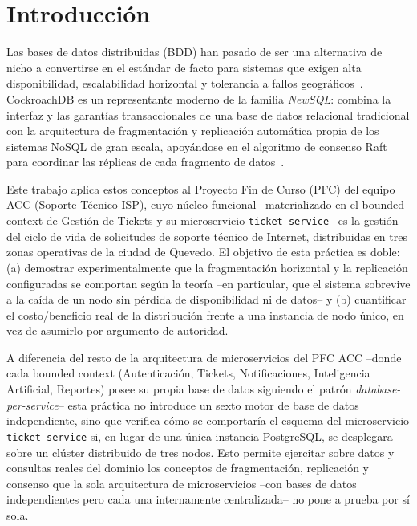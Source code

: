 \documentclass[11pt,a4paper]{article}
\begin{document}
\section{Introducci\'on}
\label{sec:introduccion}

Las bases de datos distribuidas (BDD) han pasado de ser una alternativa de
nicho a convertirse en el est\'andar de facto para sistemas que exigen alta
disponibilidad, escalabilidad horizontal y tolerancia a fallos
geogr\'aficos~\cite{kleppmann2017,ozsu2020}. CockroachDB es un representante
moderno de la familia \emph{NewSQL}: combina la interfaz y las garant\'ias
transaccionales de una base de datos relacional tradicional con la
arquitectura de fragmentaci\'on y replicaci\'on autom\'atica propia de los
sistemas NoSQL de gran escala, apoy\'andose en el algoritmo de consenso
Raft~\cite{ongaro2014} para coordinar las r\'eplicas de cada fragmento de
datos~\cite{taft2020}.

Este trabajo aplica estos conceptos al Proyecto Fin de Curso (PFC) del equipo
ACC (Soporte T\'ecnico ISP), cuyo n\'ucleo funcional --materializado en el
bounded context de Gesti\'on de Tickets y su microservicio
\texttt{ticket-service}-- es la gesti\'on del ciclo de vida de solicitudes de
soporte t\'ecnico de Internet, distribuidas en tres zonas operativas de la
ciudad de Quevedo. El objetivo de esta pr\'actica es doble: (a) demostrar
experimentalmente que la fragmentaci\'on horizontal y la replicaci\'on
configuradas se comportan seg\'un la teor\'ia --en particular, que el sistema
sobrevive a la ca\'ida de un nodo sin p\'erdida de disponibilidad ni de
datos-- y (b) cuantificar el costo/beneficio real de la distribuci\'on frente
a una instancia de nodo \'unico, en vez de asumirlo por argumento de
autoridad.

A diferencia del resto de la arquitectura de microservicios del PFC ACC
--donde cada bounded context (Autenticaci\'on, Tickets, Notificaciones,
Inteligencia Artificial, Reportes) posee su propia base de datos siguiendo el
patr\'on \emph{database-per-service}-- esta pr\'actica no introduce un sexto
motor de base de datos independiente, sino que verifica c\'omo se comportar\'ia
el esquema del microservicio \texttt{ticket-service} si, en lugar de una
\'unica instancia PostgreSQL, se desplegara sobre un cl\'uster distribuido de
tres nodos. Esto permite ejercitar sobre datos y consultas reales del dominio
los conceptos de fragmentaci\'on, replicaci\'on y consenso que la sola
arquitectura de microservicios --con bases de datos independientes pero cada
una internamente centralizada-- no pone a prueba por s\'i sola.
\end{document}

